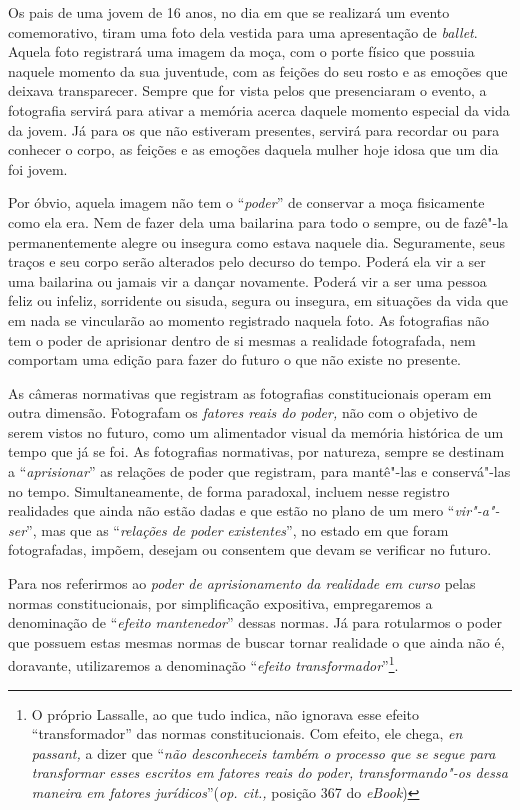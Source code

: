 Os pais de uma jovem de 16 anos, no dia em que se realizará um evento
comemorativo, tiram uma foto dela vestida para uma apresentação de
\emph{ballet}. Aquela foto registrará uma imagem da moça, com o porte
físico que possuia naquele momento da sua juventude, com as feições do
seu rosto e as emoções que deixava transparecer. Sempre que for vista
pelos que presenciaram o evento, a fotografia servirá para ativar a
memória acerca daquele momento especial da vida da jovem. Já para os que
não estiveram presentes, servirá para recordar ou para conhecer o corpo,
as feições e as emoções daquela mulher hoje idosa que um dia foi jovem.

Por óbvio, aquela imagem não tem o ``\emph{poder}'' de conservar a moça
fisicamente como ela era. Nem de fazer dela uma bailarina para todo o
sempre, ou de fazê"-la permanentemente alegre ou insegura como estava
naquele dia. Seguramente, seus traços e seu corpo serão alterados pelo
decurso do tempo. Poderá ela vir a ser uma bailarina ou jamais vir a
dançar novamente. Poderá vir a ser uma pessoa feliz ou infeliz,
sorridente ou sisuda, segura ou insegura, em situações da vida que em
nada se vincularão ao momento registrado naquela foto. As fotografias
não tem o poder de aprisionar dentro de si mesmas a realidade
fotografada, nem comportam uma edição para fazer do futuro o que não
existe no presente.

As câmeras normativas que registram as fotografias constitucionais
operam em outra dimensão. Fotografam os \emph{fatores reais do poder,}
não com o objetivo de serem vistos no futuro, como um alimentador visual
da memória histórica de um tempo que já se foi. As fotografias
normativas, por natureza, sempre se destinam a ``\emph{aprisionar}'' as
relações de poder que registram, para mantê"-las e conservá"-las no tempo.
Simultaneamente, de forma paradoxal, incluem nesse registro realidades
que ainda não estão dadas e que estão no plano de um mero
``\emph{vir"-a"-ser}'', mas que as ``\emph{relações de poder}
\emph{existentes}'', no estado em que foram fotografadas, impõem,
desejam ou consentem que devam se verificar no futuro.

Para nos referirmos ao \emph{poder de aprisionamento da realidade em
curso} pelas normas constitucionais, por simplificação expositiva,
empregaremos a denominação de ``\emph{efeito mantenedor}'' dessas
normas. Já para rotularmos o poder que possuem estas mesmas normas de
buscar tornar realidade o que ainda não é, doravante, utilizaremos a
denominação ``\emph{efeito transformador}''\footnote{O próprio Lassalle,
  ao que tudo indica, não ignorava esse efeito ``transformador'' das
  normas constitucionais. Com efeito, ele chega, \emph{en passant,} a
  dizer que ``\emph{não desconheceis também o processo que se segue para
  transformar esses escritos em fatores reais do poder, transformando"-os
  dessa maneira em fatores jurídicos}''(\emph{op. cit.,} posição 367 do
  \emph{eBook})}.


